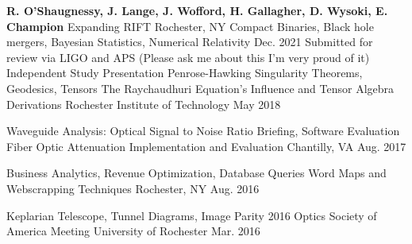 \begin{cventries}

 \cventry
  {\textbf{R. O'Shaugnessy, J. Lange, J. Wofford, H. Gallagher, D. Wysoki, E. Champion}}
    {Expanding RIFT}
    {Rochester, NY}
    {Compact Binaries, Black hole mergers, Bayesian Statistics, Numerical Relativity }
    {Dec. 2021 Submitted for review via LIGO and APS (Please ask me about this I'm very proud of it)
    }
\cventry
   {Independent Study Presentation Penrose-Hawking Singularity Theorems, Geodesics, Tensors}
{The Raychaudhuri Equation's Influence and Tensor Algebra Derivations}
   {Rochester Institute of Technology}
   {May 2018}
   {
   }

 \cventry
    {Waveguide Analysis: Optical Signal to Noise Ratio Briefing, Software Evaluation}
    {Fiber Optic Attenuation Implementation and Evaluation}
    {Chantilly, VA}
    {Aug. 2017}
    {
    }


 \cventry
    {Business Analytics, Revenue Optimization, Database Queries}
    {Word Maps and Webscrapping Techniques}
    {Rochester, NY}
    {Aug. 2016}
    {
    }

 \cventry
    {Keplarian Telescope, Tunnel Diagrams, Image Parity}
    {2016 Optics Society of America Meeting}
    {University of Rochester}
    {Mar. 2016}
    {
    }    

    
  
\end{cventries}
